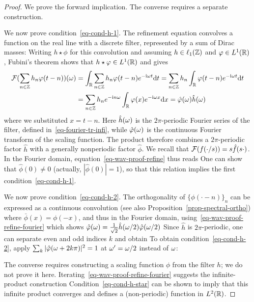 \begin{proof} We prove the forward implication. The converse requires a separate construction.

We now prove condition~\eqref{eq-cond-h-1}.
%
The refinement equation convolves a function on the real line with a discrete filter, represented by a sum of Dirac masses:
%
Writing $h \star \phi$ for this convolution and assuming $h \in \ell_1(\mathbb{Z})$ and $\varphi \in L^1(\mathbb{R})$, Fubini's theorem shows that $h \star \varphi \in L^1(\mathbb{R})$ and gives
\begin{align*}
	\mathcal{F}( \sum_{n \in \mathbb{Z}} h_n \varphi(t-n) )(\omega) &= \int_{\mathbb{R}} \sum_{n \in \mathbb{Z}} h_n \varphi(t-n) e^{-\mathrm{i} \omega t} \mathrm{d} t
	= \sum_{n \in \mathbb{Z}} h_n \int_{\mathbb{R}} \varphi(t-n) e^{-\mathrm{i} \omega t} \mathrm{d} t \\
	& = \sum_{n \in \mathbb{Z}} h_n e^{-\mathrm{i} n \omega } \int_{\mathbb{R}} \varphi(x) e^{-\mathrm{i} \omega x} \mathrm{d} x
	= \hat {\varphi}(\omega) \hat h(\omega)
\end{align*}
where we substituted $x = t-n$. Here $\hat h(\omega)$ is the $2\pi$-periodic Fourier series of the filter, defined in~\eqref{eq-fourier-tr-infi}, while $\hat{\varphi}(\omega)$ is the continuous Fourier transform of the scaling function. The product therefore combines a $2\pi$-periodic factor $\hat h$ with a generally nonperiodic factor $\hat \phi$.
%
We recall that $\mathcal{F}(f(\cdot/s)) = s \hat f(s \cdot)$.
%
In the Fourier domain, equation~\eqref{eq-wav-proof-refine} thus reads
One can show that $\hat \phi(0) \neq 0$ (actually, $|\hat \phi(0)| = 1$), so that this relation implies the first condition~\eqref{eq-cond-h-1}.


We now prove condition~\eqref{eq-cond-h-2}.
%
The orthogonality of $\{\phi(\cdot-n)\}_n$ can be expressed as a continuous convolution (see also Proposition~\ref{prop-spectral-ortho})
where $\bar \phi(x) = \phi(-x)$, 
and thus in the Fourier domain, using~\eqref{eq-wav-proof-refine-fourier} which shows $\hat{\varphi}(\omega) = \frac{1}{\sqrt{2}}\hat h(\omega/2) \hat {\varphi}(\omega/2)$
Since $\hat h$ is $2\pi$-periodic, one can separate even and odd indices $k$ and obtain
To obtain condition~\eqref{eq-cond-h-2}, apply $\sum_k |\hat {\varphi}(\omega+2k\pi)|^2=1$ at $\omega'=\omega/2$ instead of $\omega$:

The converse requires constructing a scaling function $\phi$ from the filter $h$; we do not prove it here. Iterating~\eqref{eq-wav-proof-refine-fourier} suggests the infinite-product construction
Condition~\eqref{eq-cond-h-star} can be shown to imply that this infinite product converges and defines a (non-periodic) function in $L^2(\mathbb{R})$.
\end{proof}


